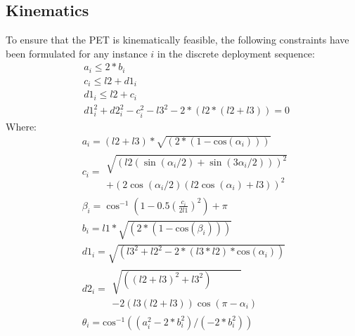 \documentclass[11pt, a4paper]{article}
\begin{document}
\subsection{Kinematics}
To ensure that the PET is kinematically feasible, the following constraints have been formulated for any instance $i$ in the discrete deployment sequence: 
\begin{align}
    &a_i \leq 2*b_i \label{tri1}\\
    &c_i \leq l2+d1_i \label{tri2}\\
    &d1_i \leq l2+c_i \label{tri3}\\
    &d1_i^2 + d2_i^2 -c_i^2-l3^2-2*(l2*(l2+l3)) = 0 \label{eq:trap}
\end{align}Where:
\begin{align}
    &a_i = (l2+l3)*\sqrt{(2*(1-\textrm{cos}(\alpha_i)))} \\
    &c_i = \begin{aligned}
    \sqrt{(l2 (\sin(\alpha_i/2) + \sin(3 \alpha_i/2)))^2} \\+ (2 \cos(\alpha_i/2) (l2 \cos(\alpha_i) + l3))^2 \end{aligned}\\
    &\beta_i = \cos^{-1}(1-0.5(\frac{c_i}{2l1})^2) + \pi \\
    &b_i = l1 *\sqrt{(2*(1-\textrm{cos}(\beta_i)))} \\
    &d1_i = \sqrt{(l3^2+l2^2 - 2*(l3*l2)*\textrm{cos}(\alpha_i))} \\
    &d2_i = \begin{aligned} \sqrt{((l2+l3)^2+l3^2)\quad\quad\quad} \\- 2(l3(l2+l3))\cos(\pi-\alpha_i) \end{aligned}\\
    &\theta_i = \textrm{cos}^{-1}((a_i^2-2*b_i^2)/(-2*b_i^2))
\end{align}
\end{document}
